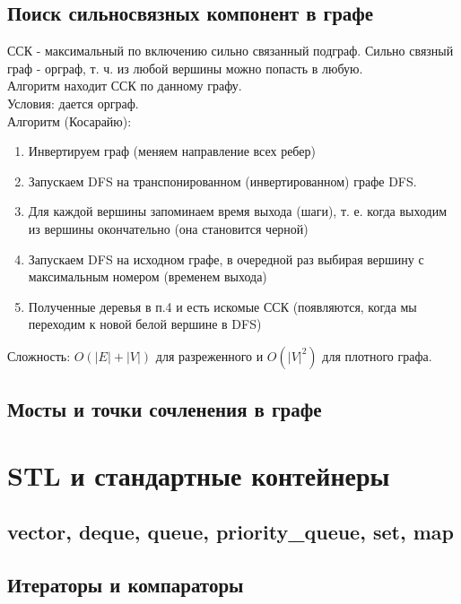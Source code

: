\documentclass[a4paper]{article}
\begin{document}
\subsection{Поиск сильносвязных компонент в графе}
ССК - максимальный по включению сильно связанный подграф. Сильно связный граф - орграф, т. ч. из любой вершины можно попасть в любую.\\
Алгоритм находит ССК по данному графу.\\
Условия: дается орграф.\\
Алгоритм (Косарайю):
\begin{enumerate}
	\item Инвертируем граф (меняем направление всех ребер)
	\item Запускаем DFS на транспонированном (инвертированном) графе DFS.
	\item Для каждой вершины запоминаем время выхода (шаги), т. е. когда выходим из вершины окончательно (она становится черной)
	\item Запускаем DFS на исходном графе, в очередной раз выбирая вершину с максимальным номером (временем выхода)
	\item Полученные деревья в п.4 и есть искомые ССК (появляются, когда мы переходим к новой белой вершине в DFS)
\end{enumerate}
Сложность: $O(|E| + |V|)$ для разреженного и $O(|V|^2)$ для плотного графа. 
\subsection{Мосты и точки сочленения в графе}

\section{STL и стандартные контейнеры}
\subsection{vector, deque, queue, priority\_queue, set, map}
\subsection{Итераторы и компараторы}
\end{document}

